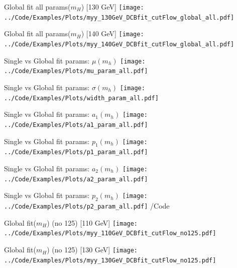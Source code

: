 \documentclass[10pt,UKenglish, leqno, xcolor = dvipsnames]{beamer}
\begin{document}
		\begin{frame}{Global fit all params($m_H$) [130 GeV]}
			\vfill
			\texttt{[image: ../Code/Examples/Plots/myy\_130GeV\_DCBfit\_cutFlow\_global\_all.pdf]}
			\vfill
		\end{frame}
	
		\begin{frame}{Global fit all params($m_H$) [140 GeV]}
			\vfill
			\texttt{[image: ../Code/Examples/Plots/myy\_140GeV\_DCBfit\_cutFlow\_global\_all.pdf]}
			\vfill
		\end{frame}
		
		\begin{frame}{Single vs Global fit params: $\mu(m_h)$}
			\vfill
			\texttt{[image: ../Code/Examples/Plots/mu\_param\_all.pdf]}
			\vfill
		\end{frame}
		
		\begin{frame}{Single vs Global fit params: $\sigma(m_h)$}
			\vfill
			\texttt{[image: ../Code/Examples/Plots/width\_param\_all.pdf]}
			\vfill
		\end{frame}
		
		\begin{frame}{Single vs Global fit params: $a_1(m_h)$}
			\vfill
			\texttt{[image: ../Code/Examples/Plots/a1\_param\_all.pdf]}
			\vfill
		\end{frame}
		
		\begin{frame}{Single vs Global fit params: $p_1(m_h)$}
			\vfill
			\texttt{[image: ../Code/Examples/Plots/p1\_param\_all.pdf]}
			\vfill
		\end{frame}
		
		\begin{frame}{Single vs Global fit params: $a_2(m_h)$}
			\vfill
			\texttt{[image: ../Code/Examples/Plots/a2\_param\_all.pdf]}
			\vfill
		\end{frame}
		
		\begin{frame}{Single vs Global fit params: $p_2(m_h)$}
			\vfill
			\texttt{[image: ../Code/Examples/Plots/p2\_param\_all.pdf]}
			\vfill
/Code		\end{frame}
	
		\begin{frame}{Global fit($m_H$) (no 125) [110 GeV]}
			\vfill
			\texttt{[image: ../Code/Examples/Plots/myy\_110GeV\_DCBfit\_cutFlow\_no125.pdf]}
			\vfill
		\end{frame}
		
		\begin{frame}{Global fit($m_H$) (no 125) [130 GeV]}
			\vfill
			\texttt{[image: ../Code/Examples/Plots/myy\_130GeV\_DCBfit\_cutFlow\_no125.pdf]}
			\vfill
		\end{frame}
		
\end{document}
